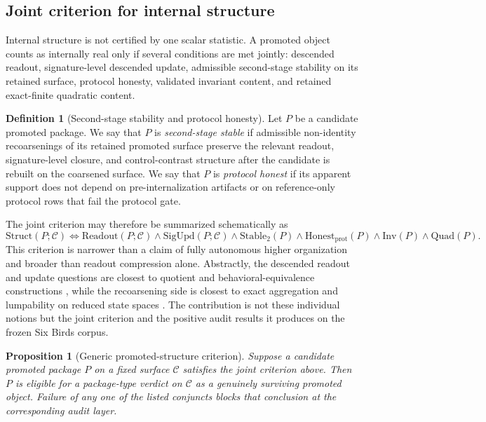 \documentclass[11pt]{article}
\newtheorem{proposition}[theorem]{Proposition}
\theoremstyle{definition}
\newtheorem{definition}[theorem]{Definition}
\begin{document}
\subsection{Joint criterion for internal structure}

Internal structure is not certified by one scalar statistic. A promoted object counts as internally real only if several conditions are met jointly: descended readout, signature-level descended update, admissible second-stage stability on its retained surface, protocol honesty, validated invariant content, and retained exact-finite quadratic content.

\begin{definition}[Second-stage stability and protocol honesty]
\label{def:stability-honesty}
Let $P$ be a candidate promoted package. We say that $P$ is \emph{second-stage stable} if admissible non-identity recoarsenings of its retained promoted surface preserve the relevant readout, signature-level closure, and control-contrast structure after the candidate is rebuilt on the coarsened surface. We say that $P$ is \emph{protocol honest} if its apparent support does not depend on pre-internalization artifacts or on reference-only protocol rows that fail the protocol gate.
\end{definition}

The joint criterion may therefore be summarized schematically as
\[
\mathrm{Struct}(P;\mathcal C)
\iff
\mathrm{Readout}(P;\mathcal C)
\wedge
\mathrm{SigUpd}(P;\mathcal C)
\wedge
\mathrm{Stable}_2(P)
\wedge
\mathrm{Honest}_{\mathrm{prot}}(P)
\wedge
\mathrm{Inv}(P)
\wedge
\mathrm{Quad}(P).
\]
This criterion is narrower than a claim of fully autonomous higher organization and broader than readout compression alone. Abstractly, the descended readout and update questions are closest to quotient and behavioral-equivalence constructions \cite{Sangiorgi2009,VanDerSchaft2004}, while the recoarsening side is closest to exact aggregation and lumpability on reduced state spaces \cite{KemenySnell1976,Buchholz1994,GivanDeanGreig2003}. The contribution is not these individual notions but the joint criterion and the positive audit results it produces on the frozen Six Birds corpus.

\begin{proposition}[Generic promoted-structure criterion]
\label{prop:generic-criterion}
Suppose a candidate promoted package $P$ on a fixed surface $\mathcal C$ satisfies the joint criterion above. Then $P$ is eligible for a package-type verdict on $\mathcal C$ as a genuinely surviving promoted object. Failure of any one of the listed conjuncts blocks that conclusion at the corresponding audit layer.
\end{proposition}
\end{document}
